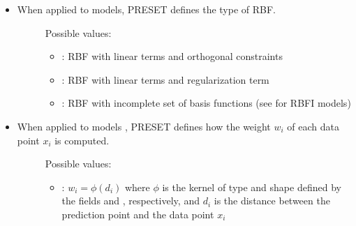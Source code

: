 \documentclass[letterpaper,10pt,english]{sphinxmanual}
\begin{document}
\begin{itemize}
\item {} \begin{description}
\item[{When applied to {\hyperref[\detokenize{SgteLib:rbf}]{}} models, PRESET defines the type of RBF.}] \leavevmode
\sphinxAtStartPar
Possible values:
\begin{itemize}
\item {} 
\sphinxAtStartPar
{}: RBF with linear terms and orthogonal constraints

\item {} 
\sphinxAtStartPar
{}: RBF with linear terms and regularization term

\item {} 
\sphinxAtStartPar
{}: RBF with incomplete set of basis functions (see  for RBFI models)

\end{itemize}



\end{description}

\item {} \begin{description}
\item[{When applied to {\hyperref[\detokenize{SgteLib:lowess}]{}} models , PRESET defines how the weight \(w_i\) of each data point \(x_i\) is computed.}] \leavevmode
\sphinxAtStartPar
Possible values:
\begin{itemize}
\item {} 
\sphinxAtStartPar
{}: \(w_i=\phi(d_i)\) where \(\phi\) is the kernel of type and shape defined by the fields {\hyperref[\detokenize{SgteLib:kernel-type}]{}} and {\hyperref[\detokenize{SgteLib:kernel-shape}]{}}, respectively, and \(d_i\) is the distance between the prediction point and the data point \(x_i\)


\end{itemize}
\end{description}
\end{itemize}
\end{document}

